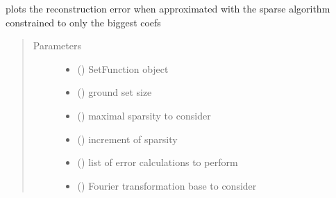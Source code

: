 \documentclass[letterpaper,10pt,english]{sphinxmanual}
\begin{document}
\begin{fulllineitems}
\label{\detokenize{setFTs:setFTs.plotting.plot_reconstruction_error_biggest_coefs}}
\sphinxAtStartPar
plots the reconstruction error when approximated with the sparse algorithm constrained to only the biggest coefs
\begin{quote}\begin{description}
\item[{Parameters}] \leavevmode\begin{itemize}
\item {} 
\sphinxAtStartPar
{} ({\hyperref[\detokenize{setFTs:setFTs.setfunctions.SetFunction}]{}}) \textendash{} SetFunction object

\item {} 
\sphinxAtStartPar
{} () \textendash{} ground set size

\item {} 
\sphinxAtStartPar
{} () \textendash{} maximal sparsity to consider

\item {} 
\sphinxAtStartPar
{} () \textendash{} increment of sparsity

\item {} 
\sphinxAtStartPar
{} (\sphinxstyleliteralemphasis{\sphinxupquote{{[}}}\sphinxstyleliteralemphasis{\sphinxupquote{{]}}}) \textendash{} list of error calculations to perform

\item {} 
\sphinxAtStartPar
{} () \textendash{} Fourier transformation base to consider

\end{itemize}

\end{description}\end{quote}

\end{fulllineitems}
\end{document}
